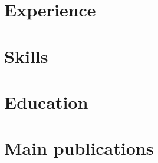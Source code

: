 \documentclass[letter,10pt]{article}
\begin{document}
    \section{Experience}
    

    \section{Skills}
    
    \section{Education}
    

    \section{Main publications}
    
\end{document}
